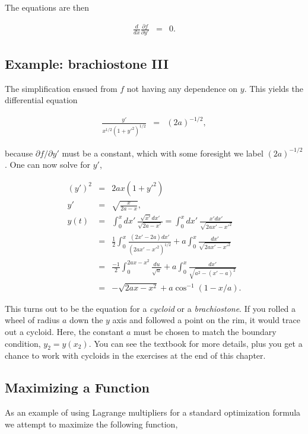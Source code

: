 \documentclass[%
oneside,                 %
final,                   %
10pt]{article}
\begin{document}
The equations are then

\begin{eqnarray*}
\frac{d}{dx}\frac{\partial f}{\partial y'}&=&0.
\end{eqnarray*}

\subsection*{Example: brachiostone III}

The simplification ensued from $f$ not having any dependence on $y$. This yields the differential equation

\begin{eqnarray}
\frac{y'}{x^{1/2}(1+y'^2)^{1/2}}&=&(2a)^{-1/2},
\end{eqnarray}

because $\partial f/\partial y'$ must be a constant, which with some
foresight we label $(2a)^{-1/2}$. One can now solve for $y'$,

\begin{eqnarray*}
(y')^2&=&2ax(1+y'^2)\\
\nonumber
y'&=&\sqrt{\frac{x}{2a-x}},\\
\nonumber
y(t)&=&\int_0^x dx'~\frac{\sqrt{x'}dx'}{\sqrt{2a-x'}}=\int_0^x dx'~\frac{x'dx'}{\sqrt{2ax'-x'^2}}\\
\nonumber
&=&\frac{1}{2}\int_0^x\frac{(2x'-2a)dx'}{(2ax'-x'^2)^{1/2}}+a\int_0^x\frac{dx'}{\sqrt{2ax'-x'^2}}\\
\nonumber
&=&\frac{-1}{2}\int_0^{2ax-x^2}\frac{du}{\sqrt{u}}+a\int_0^x\frac{dx'}{\sqrt{a^2-(x'-a)^2}}\\
&=&-\sqrt{2ax-x^2}+a\cos^{-1}(1-x/a).
\end{eqnarray*}

This turns out to be the equation for a {\it cycloid} or a {\it
brachiostone}. If you rolled a wheel of radius $a$ down the $y$ axis
and followed a point on the rim, it would trace out a cycloid. Here,
the constant $a$ must be chosen to match the boundary condition,
$y_2=y(x_2)$. You can see the textbook for more details, plus you get
a chance to work with cycloids in the exercises at the end of this
chapter.

\subsection*{Maximizing a Function}

As an example of using Lagrange multipliers for a standard
optimization formula we attempt to maximize the following function,
\end{document}
